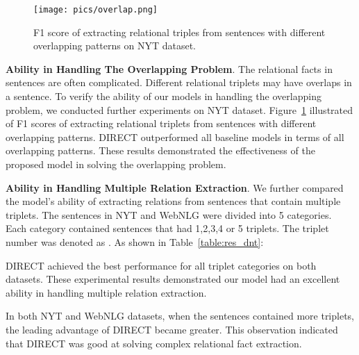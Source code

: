 \documentclass[11pt,a4paper]{article}
\begin{document}
\begin{figure}[h]
\centering
\texttt{[image: pics/overlap.png]}
\caption{F1 score of extracting relational triples from sentences with different overlapping patterns on NYT dataset.}
\label{fig:overlap}
\end{figure}

\textbf{Ability in Handling The Overlapping Problem}. The relational facts in sentences are often complicated. Different relational triplets may have overlaps in a sentence. To verify the ability of our models in handling the overlapping problem, we conducted further experiments on NYT dataset. Figure~\ref{fig:overlap} illustrated of F1 scores of extracting relational triplets from sentences with different overlapping patterns. DIRECT outperformed all baseline models in terms of all overlapping patterns. These results demonstrated the effectiveness of the proposed model in solving the overlapping problem.

\textbf{Ability in Handling Multiple Relation Extraction}. We further compared the model’s ability of extracting relations from sentences that contain multiple triplets. The sentences in NYT and WebNLG were divided into 5 categories. Each category contained sentences that had 1,2,3,4 or  5 triplets. The triplet number was denoted as . As shown in Table~\ref{table:res_dnt}:

 DIRECT achieved the best performance for all triplet categories on both datasets.  These experimental results demonstrated our model had an excellent ability in handling multiple relation extraction.

 In both NYT and WebNLG datasets, when the sentences contained more triplets, the leading advantage of DIRECT became greater. This observation indicated that DIRECT was good at solving complex relational fact extraction.
\end{document}
